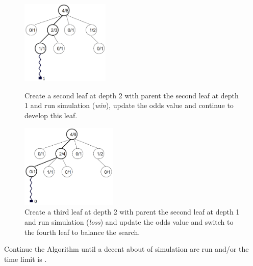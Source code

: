 \begin{figure}[H]
\centering
	\begin{minipage}[b]{0.45\linewidth}
		\centering
		\includegraphics[height=4cm]{1_Presentation/1.2_Algorithm_MCTS_Benoit/img/8.png}
		\caption{\label{fig:8}Create a second leaf at depth 2 with parent the second leaf at depth 1 and run simulation (\textit{win}), update the odds value and continue to develop this leaf.}
	\end{minipage}%
	\hspace*{1cm}
	\begin{minipage}[b]{0.45\linewidth}
		\centering
		\includegraphics[height=4cm]{1_Presentation/1.2_Algorithm_MCTS_Benoit/img/9.png}
		\caption{\label{fig:9}Create a third leaf at depth 2 with parent the second leaf at depth 1 and run simulation (\textit{loss}) and update the odds value and switch to the fourth leaf to balance the search.}
	\end{minipage}%
\end{figure}
\noindent
Continue the Algorithm until a decent about of simulation are run and/or the time limit is .
